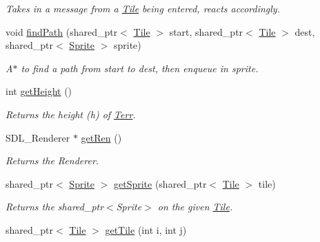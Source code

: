 \begin{DoxyCompactItemize}
\begin{DoxyCompactList}\small\item\em Takes in a message from a \hyperlink{class_tile}{Tile} being entered, reacts accordingly. \end{DoxyCompactList}\item 
void \hyperlink{class_terr_ad0596843b8e4c1ddd9b39220837b88ce}{find\+Path} (shared\+\_\+ptr$<$ \hyperlink{class_tile}{Tile} $>$ start, shared\+\_\+ptr$<$ \hyperlink{class_tile}{Tile} $>$ dest, shared\+\_\+ptr$<$ \hyperlink{class_sprite}{Sprite} $>$ sprite)\hypertarget{class_terr_ad0596843b8e4c1ddd9b39220837b88ce}{}\label{class_terr_ad0596843b8e4c1ddd9b39220837b88ce}

\begin{DoxyCompactList}\small\item\em A$\ast$ to find a path from start to dest, then enqueue in sprite. \end{DoxyCompactList}\item 
int \hyperlink{class_terr_a0ef7c8147e12a2291fc84d9ebc67a8df}{get\+Height} ()\hypertarget{class_terr_a0ef7c8147e12a2291fc84d9ebc67a8df}{}\label{class_terr_a0ef7c8147e12a2291fc84d9ebc67a8df}

\begin{DoxyCompactList}\small\item\em Returns the height (h) of \hyperlink{class_terr}{Terr}. \end{DoxyCompactList}\item 
S\+D\+L\+\_\+\+Renderer $\ast$ \hyperlink{class_terr_a85a154825a89e15d9a94292106782438}{get\+Ren} ()\hypertarget{class_terr_a85a154825a89e15d9a94292106782438}{}\label{class_terr_a85a154825a89e15d9a94292106782438}

\begin{DoxyCompactList}\small\item\em Returns the Renderer. \end{DoxyCompactList}\item 
shared\+\_\+ptr$<$ \hyperlink{class_sprite}{Sprite} $>$ \hyperlink{class_terr_abd52d806d98279c1b5e25949acf14b33}{get\+Sprite} (shared\+\_\+ptr$<$ \hyperlink{class_tile}{Tile} $>$ tile)\hypertarget{class_terr_abd52d806d98279c1b5e25949acf14b33}{}\label{class_terr_abd52d806d98279c1b5e25949acf14b33}

\begin{DoxyCompactList}\small\item\em Returns the shared\+\_\+ptr$<$\+Sprite$>$ on the given \hyperlink{class_tile}{Tile}. \end{DoxyCompactList}\item 
shared\+\_\+ptr$<$ \hyperlink{class_tile}{Tile} $>$ \hyperlink{class_terr_aac1903a210962f56187208297c8de12f}{get\+Tile} (int i, int j)\hypertarget{class_terr_aac1903a210962f56187208297c8de12f}{}\label{class_terr_aac1903a210962f56187208297c8de12f}


\end{DoxyCompactItemize}
